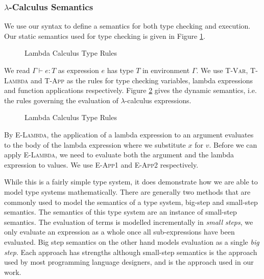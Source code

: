 \documentclass[11pt
              , a4paper
              , twoside
              , openright
              ]{report}
\numberwithin{case}{theorem}
\numberwithin{subcase}{case}
\begin{document}
\subsubsection{$\lambda$-Calculus Semantics}
We use our syntax to define a semantics for both type checking and execution. Our static semantics used for type checking is given in Figure \ref{f:lambda_type}.
\begin{figure}[t]
\caption{Lambda Calculus Type Rules}
\label{f:lambda_type}
\end{figure}
We read $\Gamma \vdash e : T$ as expression $e$ has type $T$ in environment $\Gamma$. We use \textsc{T-Var}, \textsc{T-Lambda} and \textsc{T-App} as the rules for type checking variables, lambda expressions and function applications respectively. Figure \ref{f:lambda_eval} gives the dynamic semantics, i.e. the rules governing the evaluation of $\lambda$-calculus expressions.
\begin{figure}[t]
\caption{Lambda Calculus Type Rules}
\label{f:lambda_eval}
\end{figure}
By \textsc{E-Lambda}, the application of a lambda expression to an argument evaluates to the body of the lambda expression where we substitute $x$ for $v$. Before we can apply \textsc{E-Lambda}, we need to evaluate both the argument and the lambda expression to values. We use \textsc{E-App1} and \textsc{E-App2} respectively.

While this is a fairly simple type system, it does demonstrate how we are able to model type systems mathematically. There are generally two methods that are commonly used to model the semantics of a type system, big-step \cite{Kahn:1987:NS:28220.28222} and small-step \cite{Plotkin81astructural} semantics. The semantics of this type system are an instance of small-step semantics. The evaluation of terms is modelled incrementally in \emph{small steps}, we only evaluate an expression as a whole once all sub-expressions have been evaluated. Big step semantics on the other hand models evaluation as a single \emph{big step}. Each approach has strengths although small-step semantics is the approach used by most programming language designers, and is the approach used in our work.
\end{document}
